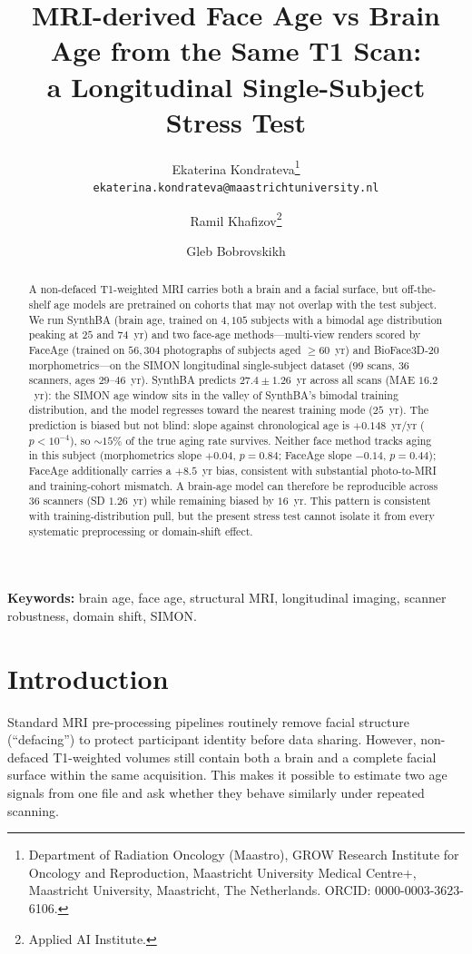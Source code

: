 \documentclass[11pt]{article}
\title{MRI-derived Face Age vs Brain Age from the Same T1 Scan:\\
  a Longitudinal Single-Subject Stress Test}
\author{
  Ekaterina Kondrateva\thanks{Department of Radiation Oncology (Maastro),
  GROW Research Institute for Oncology and Reproduction, Maastricht University
  Medical Centre+, Maastricht University, Maastricht, The Netherlands.
  ORCID: 0000-0003-3623-6106.}\\
  \texttt{ekaterina.kondrateva@maastrichtuniversity.nl}
  \and Ramil Khafizov\thanks{Applied AI Institute.}
  \and Gleb Bobrovskikh\footnotemark[2]
}
\date{}
\begin{document}
\maketitle

\begin{abstract}
  A non-defaced T1-weighted MRI carries both a brain and a facial surface,
  but off-the-shelf age models are pretrained on cohorts that may not
  overlap with the test subject.  We run SynthBA (brain age, trained on
  $4{,}105$ subjects with a bimodal age distribution peaking at $25$ and
  $74$~yr) and two face-age methods---multi-view renders scored by FaceAge
  (trained on $56{,}304$ photographs of subjects aged $\geq 60$~yr) and
  BioFace3D-20 morphometrics---on the SIMON longitudinal single-subject
  dataset ($99$ scans, $36$ scanners, ages $29$--$46$~yr).
  SynthBA predicts $27.4 \pm 1.26$~yr across all scans (MAE $16.2$~yr): the
  SIMON age window sits in the valley of SynthBA's bimodal training
  distribution, and the model regresses toward the nearest training mode
  ($25$~yr).  The prediction is biased but not blind: slope against
  chronological age is $+0.148$~yr/yr ($p<10^{-4}$), so $\sim 15\%$ of the
  true aging rate survives.  Neither face method tracks aging in this
  subject (morphometrics slope $+0.04$, $p{=}0.84$; FaceAge slope
  $-0.14$, $p{=}0.44$); FaceAge additionally carries a $+8.5$~yr bias,
  consistent with substantial photo-to-MRI and training-cohort mismatch.
  A brain-age model can therefore be reproducible across $36$ scanners (SD
  $1.26$~yr) while remaining biased by $16$~yr. This pattern is consistent
  with training-distribution pull, but the present stress test cannot isolate
  it from every systematic preprocessing or domain-shift effect.
\end{abstract}

\noindent\textbf{Keywords:} brain age, face age, structural MRI, longitudinal
imaging, scanner robustness, domain shift, SIMON.

\section{Introduction}

Standard MRI pre-processing pipelines routinely remove facial structure
(``defacing'') to protect participant identity before data sharing.
However, non-defaced T1-weighted volumes still contain both a brain and a
complete facial surface within the same acquisition.  This makes it possible
to estimate two age signals from one file and ask whether they behave
similarly under repeated scanning.
\end{document}
